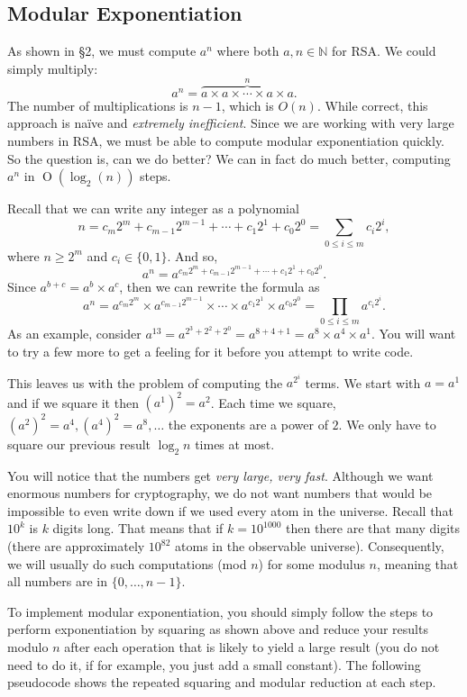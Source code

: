 \subsection{Modular Exponentiation}

As shown in \S2, we must compute $a^n$ where both $a, n \in \mathbb{N}$
for RSA. We could simply multiply:
\[
  a^n = \overbrace{a \times a \times \cdots \times a \times a}^n .
\]
The number of multiplications is $n-1$,
which is ${O}(n)$. While correct, this approach is na{\"{i}}ve and
\emph{extremely inefficient}. Since we are working with very large
numbers in RSA, we must be able to compute modular exponentiation
quickly. So the question is, can we do better? We can in fact do much
better, computing $a^n$ in $\operatorname{O}(\log_2(n))$ steps.

Recall that we can write any integer as a polynomial
\[
  n = c_m 2^m + c_{m-1} 2^{m-1} + \cdots + c_1 2^1 + c_0 2^0 =
  \sum_{0\le i \le m} c_i 2^i ,
\]
where $n \ge 2^m$ and $c_i \in \{0, 1\}$. And so,
\[
  a^n = a^{c_m 2^m + c_{m-1} 2^{m-1} + \cdots + c_1 2^1 + c_0 2^0} .
\]
Since $a^{b+c} = a^b \times a^c$, then we can rewrite the formula as
\[
  a^n = a^{c_m 2^m} \times a^{c_{m-1} 2^{m-1}} \times \cdots \times
  a^{c_1 2^1} \times a^{c_0 2^0} = \prod_{0\le i \le m} a^{c_i 2^i} .
\]
As an example, consider $a^{13} = a^{2^3 + 2^2 + 2^0} = a^{8 + 4 + 1} =
a^8 \times a^4 \times a^1$. You will want to try a few more to get a
feeling for it before you attempt to write code.

This leaves us with the problem of computing the $a^{2^i}$ terms. We
start with $a = a^1$ and if we square it then $(a^1)^2 = a^2$. Each
time we square, $(a^2)^2 = a^4, (a^4)^2 = a^8, \ldots$ the exponents
are a power of $2$. We only have to square our previous result $\log_2
n$ times at most.

You will notice that the numbers get \emph{very large, very fast}.
Although we want enormous numbers for cryptography, we do not want
numbers that would be impossible to even write down if we used every
atom in the universe. Recall that $10^k$ is $k$ digits long. That
means that if $k=10^{1000}$ then there are that many digits (there are
approximately $10^{82}$ atoms in the observable universe).
Consequently, we will usually do such computations (mod ${n}$) for
some modulus $n$, meaning that all numbers are in $\{0, \ldots,
n-1\}$.

To implement modular exponentiation, you should simply follow the
steps to perform exponentiation by squaring as shown above and
reduce your results modulo $n$ after each operation that is likely to
yield a large result (you do not need to do it, if for example, you
just add a small constant). The following pseudocode shows the
repeated squaring and modular reduction at each step.


